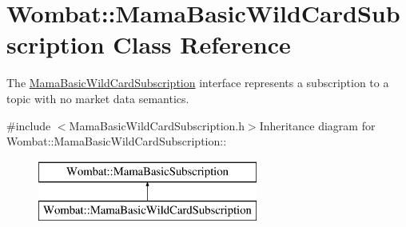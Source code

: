 \hypertarget{classWombat_1_1MamaBasicWildCardSubscription}{
\section{Wombat::MamaBasicWildCardSubscription Class Reference}
\label{classWombat_1_1MamaBasicWildCardSubscription}
}


The {\ttfamily \hyperlink{classWombat_1_1MamaBasicWildCardSubscription}{MamaBasicWildCardSubscription}} interface represents a subscription to a topic with no market data semantics.  


{\ttfamily \#include $<$MamaBasicWildCardSubscription.h$>$}Inheritance diagram for Wombat::MamaBasicWildCardSubscription::\begin{figure}[H]
\begin{center}
\leavevmode
\includegraphics[height=2cm]{classWombat_1_1MamaBasicWildCardSubscription}
\end{center}
\end{figure}
